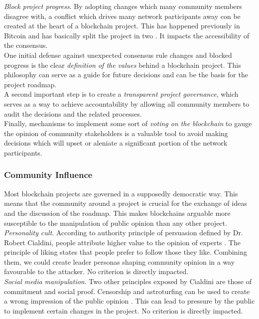 \documentclass[12pt,a4paper]{article}
\begin{document}
\textit{Block project progress}. By adopting changes which many community members disagree with, a conflict which drives many network participants away con be created at the heart of a blockchain project. This has happened previously in Bitcoin and has basically split the project in two \cite{cash}. It impacts the accessibility of the \gls{consensus}.\\

One initial defense against unexpected consensus rule changes and blocked progress is the clear \textit{definition of the values} behind a blockchain project. This philosophy can serve as a guide for future decisions and can be the basis for the project roadmap.\\

A second important step is to create a \textit{transparent project governance}, which serves as a way to achieve accountability by allowing all community members to audit the decisions and the related processes.\\

Finally, mechanisms to implement some sort of \textit{voting on the blockchain} to gauge the opinion of community stakeholders is a valuable tool to avoid making decisions which will upset or aleniate a significant portion of the network participants.\\

\subsubsection{Community Influence}

Most blockchain projects are governed in a supposedly democratic way. This means that the community around a project is crucial for the exchange of ideas and the discussion of the roadmap. This makes \glspl{blockchain} arguable more susceptible to the manipulation of public opinion than any other project.\\

\textit{Personality cult}. According to authority principle of persuasion defined by Dr. Robert Cialdini, people attribute higher value to the opinion of experts \cite{influence}. The principle of liking states that people prefer to follow those they like. Combining them, we could create leader personas shaping community opinion in a way favourable to the attacker. No criterion is directly impacted.\\

\textit{Social media manipulation}. Two other principles exposed by Cialdini are those of commitment and social proof. Censorship and astroturfing can be used to create a wrong impression of the public opinion \cite{astroturf}. This can lead to pressure by the public to implement certain changes in the project. No criterion is directly impacted.\\
\end{document}
